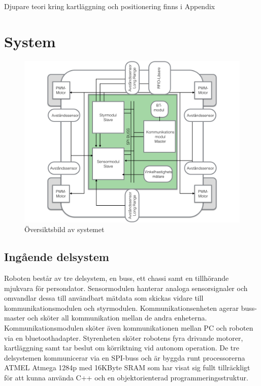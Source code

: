 \documentclass[a4paper,12pt,fleqn]{article}
\begin{document}
Djupare teori kring kartläggning och positionering finns i Appendix


\newpage
\section{System}

\begin{figure}[htp] %
  \begin{center}
  \includegraphics[keepaspectratio=true,width=\linewidth]{bilder/overview}  %
  \end{center}
  \caption{Översiktsbild av systemet} %
  \label{fig:overview}
\end{figure}

\subsection{Ingående delsystem}
Roboten består av tre delsystem, en buss, ett chassi samt en tillhörande mjukvara för persondator. Sensormodulen hanterar analoga sensorsignaler och omvandlar dessa till användbart mätdata som skickas vidare till kommunikationsmodulen och styrmodulen. 
Kommunikationsenheten agerar buss-master och sköter all kommunikation mellan de andra enheterna. Kommunikationsmodulen sköter även kommunikationen mellan PC och roboten via en bluetoothadapter. Styrenheten sköter robotens fyra drivande motorer, kartläggning samt tar beslut om körriktning vid autonom operation.
De tre delsystemen kommunicerar via en SPI-buss och är byggda runt processorerna ATMEL Atmega 1284p med 16KByte SRAM som har visat sig fullt tillräckligt för att kunna använda C++ och en objektorienterad programmeringsstruktur.
\end{document}
